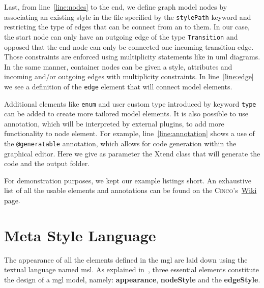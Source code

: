 Last, from line~\ref{line:nodes} to the end, we define graph model nodes by associating an existing style in the file specified by the \lstinline[language=MGL]{stylePath} keyword and restricting the type of edges that can be connect from an to them. In our case, the start node can only have an outgoing edge of the type \lstinline[language=MGL]{Transition} and opposed that the end node can only be connected one incoming transition edge. Those constraints are enforced using multiplicity statements like in \acrfull{uml} diagrams. In the same manner, container nodes can be given a style, attributes and incoming and/or outgoing edges with multiplicity constraints. In line~\ref{line:edge} we see a definition of the \lstinline[language=MGL]{edge} element that will connect model elements.

Additional elements like \lstinline[language=MGL]{enum} and user custom type introduced by keyword \lstinline[language=MGL]{type} can be added to create more tailored model elements. It is also possible to use annotation, which will be interpreted by external plugins, to add more functionality to node element. For example, line~\ref{line:annotation} shows a use of the \lstinline[language=MGL]{@generatable} annotation, which allows for code generation within the graphical editor. Here we give as parameter the Xtend class that will generate the code and the output folder.

For demonstration purposes, we kept our example listings short. An exhaustive list of all the usable elements and annotations can be found on the \textsc{Cinco}'s~\href{https://gitlab.com/scce/cinco/-/wikis/Cinco-Product-Specification}{Wiki page}.

\section{Meta Style Language}\label{sec:MSL}
The appearance of all the elements defined in the \acrshort{mgl} are laid down using the textual language named \acrfull{msl}. As explained in~\cite{gitlabcinco}, three essential elements constitute the design of a \acrshort{mgl} model, namely: \textbf{appearance}, \textbf{nodeStyle} and the \textbf{edgeStyle}.

